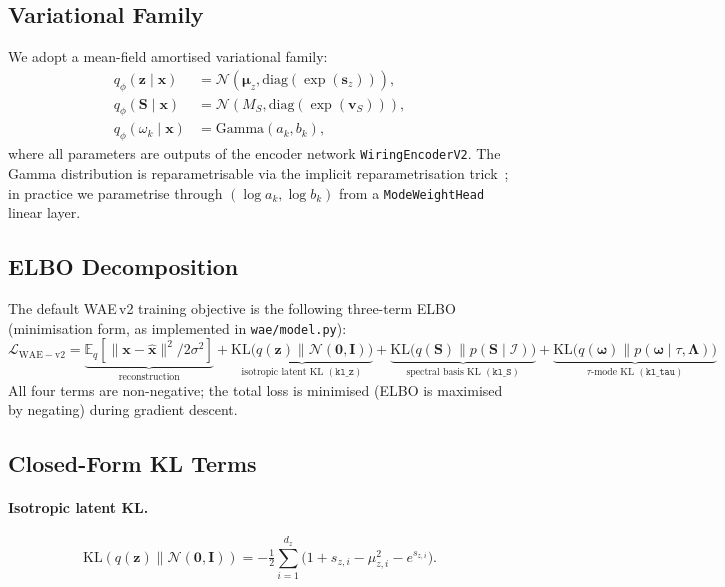 \documentclass[11pt,a4paper]{article}
\newcommand{\E}{\mathbb{E}}
\newcommand{\KL}{\mathrm{KL}}
\newcommand{\N}{\mathcal{N}}
\newcommand{\I}{\mathcal{I}}
\newcommand{\diag}{\mathrm{diag}}
\newcommand{\bLambda}{\bm{\Lambda}}
\newcommand{\bS}{\bm{S}}
\newcommand{\bz}{\bm{z}}
\newcommand{\bmu}{\bm{\mu}}
\newcommand{\bomega}{\bm{\omega}}
\newcommand{\bx}{\bm{x}}
\begin{document}
\subsection{Variational Family}

We adopt a mean-field amortised variational family:
\begin{align}
  q_\phi(\bz\mid\bx) &= \N(\bmu_z, \diag(\exp(\bm{s}_z))), \\
  q_\phi(\bS\mid\bx) &= \N(M_S, \diag(\exp(\bm{v}_S))), \\
  q_\phi(\omega_k\mid\bx) &= \mathrm{Gamma}(a_k, b_k),
\end{align}
where all parameters are outputs of the encoder network \texttt{WiringEncoderV2}.
The Gamma distribution is reparametrisable via the implicit reparametrisation
trick~\citep{figurnov2018implicit}; in practice we parametrise through
$(\log a_k, \log b_k)$ from a \texttt{ModeWeightHead} linear layer.

\subsection{ELBO Decomposition}

The default WAE\,v2 training objective is the following three-term ELBO
(minimisation form, as implemented in \texttt{wae/model.py}):
\begin{equation}
  \boxed{
  \mathcal{L}_{\mathrm{WAE-v2}}
  = \underbrace{\E_q[\|\bx - \hat{\bx}\|^2 / 2\sigma^2]}_
      {\text{reconstruction}}
  + \underbrace{\KL\bigl(q(\bz)\|\N(\mathbf{0},\bm{I})\bigr)}_
      {\text{isotropic latent KL }(\mathtt{kl\_z})}
  + \underbrace{\KL\bigl(q(\bS)\|p(\bS\mid\I)\bigr)}_
      {\text{spectral basis KL }(\mathtt{kl\_S})}
  + \underbrace{\KL\bigl(q(\bomega)\|p(\bomega\mid\tau,\bLambda)\bigr)}_
      {\tau\text{-mode KL }(\mathtt{kl\_tau})}
  }
  \label{eq:elbo_v2}
\end{equation}
All four terms are non-negative; the total loss is minimised (ELBO is
maximised by negating) during gradient descent.

\subsection{Closed-Form KL Terms}

\paragraph{Isotropic latent KL.}
\begin{equation}
  \KL(q(\bz)\|\N(\mathbf{0},\bm{I})) =
  -\tfrac{1}{2}\sum_{i=1}^{d_z}\!
  \bigl(1 + s_{z,i} - \mu_{z,i}^2 - e^{s_{z,i}}\bigr).
  \label{eq:kl_z}
\end{equation}
\end{document}
